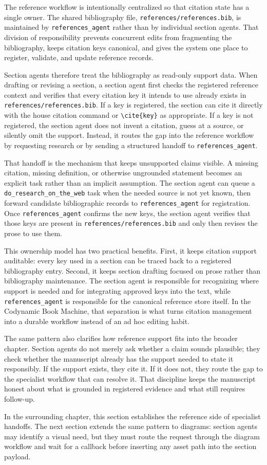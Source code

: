 The reference workflow is intentionally centralized so that citation state has a single owner. The shared bibliography file, \texttt{references/references.bib}, is maintained by \texttt{references\_agent} rather than by individual section agents. That division of responsibility prevents concurrent edits from fragmenting the bibliography, keeps citation keys canonical, and gives the system one place to register, validate, and update reference records.

Section agents therefore treat the bibliography as read-only support data. When drafting or revising a section, a section agent first checks the registered reference context and verifies that every citation key it intends to use already exists in \texttt{references/references.bib}. If a key is registered, the section can cite it directly with the house citation command or \texttt{\textbackslash cite\{key\}} as appropriate. If a key is not registered, the section agent does not invent a citation, guess at a source, or silently omit the support. Instead, it routes the gap into the reference workflow by requesting research or by sending a structured handoff to \texttt{references\_agent}.

That handoff is the mechanism that keeps unsupported claims visible. A missing citation, missing definition, or otherwise ungrounded statement becomes an explicit task rather than an implicit assumption. The section agent can queue a \texttt{do\_research\_on\_the\_web} task when the needed source is not yet known, then forward candidate bibliographic records to \texttt{references\_agent} for registration. Once \texttt{references\_agent} confirms the new keys, the section agent verifies that those keys are present in \texttt{references/references.bib} and only then revises the prose to use them.

This ownership model has two practical benefits. First, it keeps citation support auditable: every key used in a section can be traced back to a registered bibliography entry. Second, it keeps section drafting focused on prose rather than bibliography maintenance. The section agent is responsible for recognizing where support is needed and for integrating approved keys into the text, while \texttt{references\_agent} is responsible for the canonical reference store itself. In the Codynamic Book Machine, that separation is what turns citation management into a durable workflow instead of an ad hoc editing habit.

The same pattern also clarifies how reference support fits into the broader chapter. Section agents do not merely ask whether a claim sounds plausible; they check whether the manuscript already has the support needed to state it responsibly. If the support exists, they cite it. If it does not, they route the gap to the specialist workflow that can resolve it. That discipline keeps the manuscript honest about what is grounded in registered evidence and what still requires follow-up.

In the surrounding chapter, this section establishes the reference side of specialist handoffs. The next section extends the same pattern to diagrams: section agents may identify a visual need, but they must route the request through the diagram workflow and wait for a callback before inserting any asset path into the section payload.
